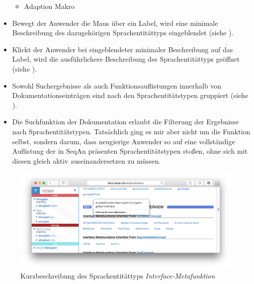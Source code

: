 \begin{itemize}
\begin{itemize}
    \item[]  Adaption
    \hspace{1em}  Makro
  \end{itemize}
  \item Bewegt der Anwender die Maus über ein Label, wird eine minimale Beschreibung des dazugehörigen Sprachentitättyps eingeblendet (siehe ).
  \item Klickt der Anwender bei eingeblendeter minimaler Beschreibung auf das Label, wird die ausführlichere Beschreibung des Sprachentitättyps geöffnet (siehe ).
  \item Sowohl Suchergebnisse als auch Funktionsauflistungen innerhalb von Dokumentationseinträgen sind nach den Sprachentitätstypen gruppiert (siehe ).
  \item Die Suchfunktion der Dokumentation erlaubt die Filterung der Ergebnisse nach Sprachentitätstypen. Tatsächlich ging es mir aber nicht um die Funktion selbst, sondern darum, dass neugierige Anwender so auf eine vollständige Auflistung der in SeqAn präsenten Sprachentitätstypen stoßen, ohne sich mit diesen gleich aktiv auseinandersetzen zu müssen.
\end{itemize}

\begin{figure}[ht!]
  \centering
    \includegraphics[width=0.9\linewidth]{Figures/dox/let-hover.png}
    \caption{Kurzbeschreibung des Sprachentitättyps \textit{Interface-Metafunktion}}
    \label{fig:dox-let-hover}
\end{figure}

